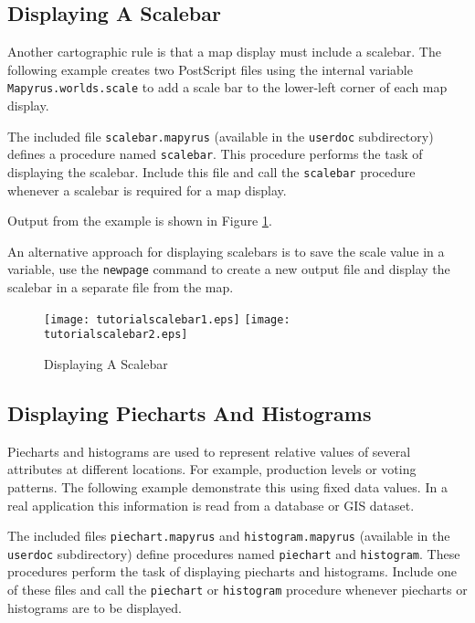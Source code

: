 \subsection{Displaying A Scalebar}
\label{tutorialscalebar}

Another cartographic rule is that a map display must include a scalebar.  The
following example creates two PostScript files using the internal variable
\texttt{Mapyrus.worlds.scale} to add a scale bar to the lower-left corner
of each map display.

The included file \texttt{scalebar.mapyrus} (available in the \texttt{userdoc}
subdirectory) defines a procedure named \texttt{scalebar}.  This procedure
performs the task of displaying the scalebar.  Include this file and call the
\texttt{scalebar} procedure whenever a scalebar is required for a map display.

Output from the example is shown in Figure \ref{tutorialscalebar1}.

An alternative approach for displaying scalebars is to save the scale value in
a variable, use the \texttt{newpage} command to create a new output file and
display the scalebar in a separate file from the map.



\begin{figure}[htb]
\texttt{[image: tutorialscalebar1.eps]}
\texttt{[image: tutorialscalebar2.eps]}
\caption{Displaying A Scalebar}
\label{tutorialscalebar1}
\end{figure}

\subsection{Displaying Piecharts And Histograms}
\label{piechart}

Piecharts and histograms
are used to represent relative values of several attributes at
different locations.  For example, production levels or voting patterns.  The
following example demonstrate this using fixed data values.
In a real application this information is read from a
database or GIS dataset.

The included files
\texttt{piechart.mapyrus}
and
\texttt{histogram.mapyrus}
(available in the \texttt{userdoc}
subdirectory) define procedures named
\texttt{piechart}
and
\texttt{histogram}.
These procedures
perform the task of displaying piecharts and histograms.
Include one of these files and call the
\texttt{piechart}
or
\texttt{histogram}
procedure whenever piecharts or histograms are to be displayed.

